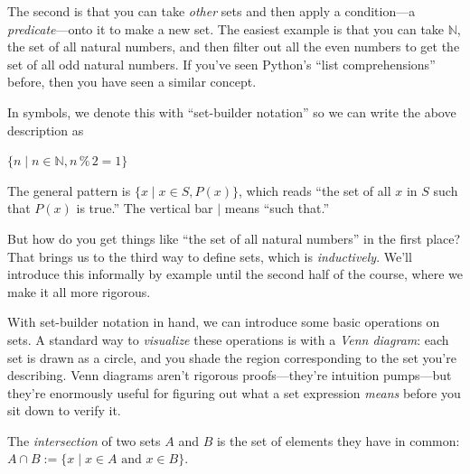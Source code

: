 \documentclass[11pt]{article}
\begin{document}
The second is that you can take \emph{other} sets and then apply a condition---a \emph{predicate}---onto it to make a new set. The easiest example is that you can take $\mathbb{N}$, the set of all natural numbers, and then filter out all the even numbers to get the set of all odd natural numbers. If you've seen Python's ``list comprehensions'' before, then you have seen a similar concept.

In symbols, we denote this with ``set-builder notation'' so we can write the above description as

$\{n \mid n \in \mathbb{N} , n \mathbin{\%} 2 = 1\}$

The general pattern is $\{x \mid x \in S, P(x)\}$, which reads ``the set of all $x$ in $S$ such that $P(x)$ is true.'' The vertical bar $\mid$ means ``such that.''

But how do you get things like ``the set of all natural numbers'' in the first place? That brings us to the third way to define sets, which is \emph{inductively}. We'll introduce this informally by example until the second half of the course, where we make it all more rigorous.

With set-builder notation in hand, we can introduce some basic operations on sets. A standard way to \emph{visualize} these operations is with a \emph{Venn diagram}: each set is drawn as a circle, and you shade the region corresponding to the set you're describing. Venn diagrams aren't rigorous proofs---they're intuition pumps---but they're enormously useful for figuring out what a set expression \emph{means} before you sit down to verify it.

\begin{definition}[Intersection]
The \emph{intersection} of two sets $A$ and $B$ is the set of elements they have in common:
$A \cap B := \{ x \mid x \in A \text{ and } x \in B\}$.
\end{definition}

\begin{center}
\end{center}
\end{document}
